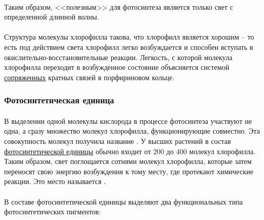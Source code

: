\paragraph*{}Таким образом, <<полезным>> для фотосинтеза является только свет с определенной длинной волны.




\paragraph*{}Структура молекулы хлорофилла такова, что хлорофилл является хорошим  -- то есть под действием света хлорофилл легко возбуждается и способен вступать в окислительно-восстановительные реакции. Легкость, с которой молекула хлорофилла переходит в возбужденное состояние объясняется системой \hyperlink{question_bounds}{сопряженных} кратных связей в порфириновом кольце.

\subsubsection*{Фотосинтетическая единица}


\paragraph*{}В выделении одной молекулы кислорода в процессе фотосинтеза участвуют не одна, а сразу множество молекул хлорофилла, функционирующие совместно. Эта совокупность молекул получила название . У высших растений в состав \hyperlink{question_photo_unit}{фотосинтетической единицы} обычно входит от 200 до 400 молекул хлорофилла. Таким образом, свет поглощается сотнями молекул хлорофилла, которые затем переносят свою энергию возбуждения к тому месту, где протекают химические реакции. Это место называется . 

\paragraph*{}В составе фотосинтетической единицы выделяют два функциональных типа фотосинтетических пигментов:

